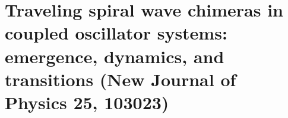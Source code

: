 \chapter{Traveling spiral wave chimeras in coupled
oscillator systems: emergence, dynamics, and
transitions (New Journal of Physics 25, 103023)}